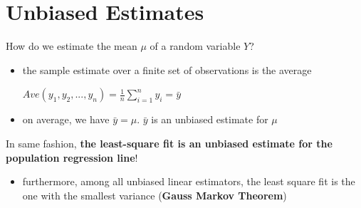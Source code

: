 	\section{Unbiased Estimates}
		How do we estimate the mean $\mu$ of a random variable $Y$?
		\begin{itemize}
			\item the sample estimate over a finite set of observations is the average
				\begin{center}
					$Ave(y_1,y_2,...,y_n) = \frac{1}{n} \sum\limits_{i=1}^n y_i = \bar{y}$
				\end{center}
			\item on average, we have $\bar{y}=\mu$. $\bar{y}$ is an unbiased estimate for $\mu$
		\end{itemize}
		In same fashion, \textbf{the least-square fit is an unbiased estimate for the population regression line}!
		\begin{itemize}
			\item furthermore, among all unbiased linear estimators, the least square fit is the one with the smallest variance (\textbf{Gauss Markov Theorem})
		\end{itemize}
	
	
